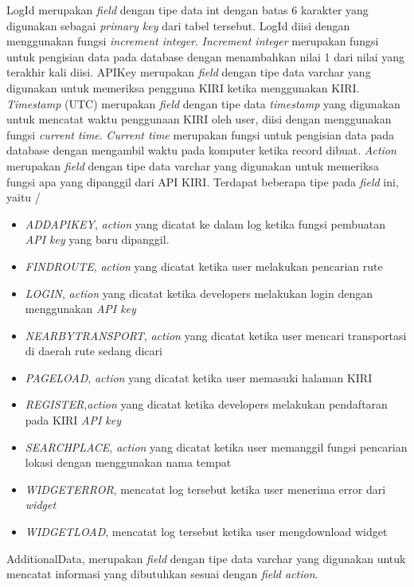 LogId merupakan \textsl{field} dengan tipe data int dengan batas 6 karakter yang digunakan sebagai \textsl{primary key} dari tabel tersebut. LogId diisi dengan menggunakan fungsi \textsl{increment integer}. \textsl{Increment integer} merupakan fungsi untuk pengisian data pada database dengan menambahkan nilai 1 dari nilai yang terakhir kali diisi.
APIKey merupakan \textsl{field} dengan tipe data varchar yang digunakan untuk memeriksa pengguna KIRI ketika menggunakan KIRI.
\textsl{Timestamp} (UTC) merupakan \textsl{field} dengan tipe data \textsl{timestamp} yang digunakan untuk mencatat waktu penggunaan KIRI oleh user, diisi dengan menggunakan fungsi \textsl{current time}. \textsl{Current time} merupakan fungsi untuk pengisian data pada database dengan mengambil waktu pada komputer ketika record dibuat.
\textsl{Action} merupakan \textsl{field} dengan tipe data varchar yang digunakan untuk memeriksa fungsi apa yang dipanggil dari API KIRI. Terdapat beberapa tipe pada \textsl{field} ini, yaitu
/\begin{itemize}
	\item \textsl{ADDAPIKEY}, \textsl{action} yang dicatat ke dalam log ketika fungsi pembuatan \textsl{API key} yang baru dipanggil.
	\item \textsl{FINDROUTE}, \textsl{action} yang dicatat ketika user melakukan pencarian rute
	\item \textsl{LOGIN}, \textsl{action} yang dicatat ketika developers melakukan login dengan menggunakan \textsl{API key}
	\item \textsl{NEARBYTRANSPORT}, \textsl{action} yang dicatat ketika user mencari transportasi di daerah rute sedang dicari
	\item \textsl{PAGELOAD}, \textsl{action} yang dicatat ketika user memasuki halaman KIRI
 	\item \textsl{REGISTER},\textsl{action} yang dicatat ketika developers melakukan pendaftaran pada KIRI \textsl{API key}
	\item \textsl{SEARCHPLACE}, \textsl{action} yang dicatat ketika user memanggil fungsi pencarian lokasi dengan menggunakan nama tempat
	\item \textsl{WIDGETERROR}, mencatat log tersebut ketika user menerima error dari \textit{widget}
	\item \textsl{WIDGETLOAD}, mencatat log tersebut ketika user mengdownload widget
\end{itemize}
AdditionalData, merupakan \textsl{field} dengan tipe data varchar yang digunakan untuk mencatat informasi yang dibutuhkan sesuai dengan \textsl{field action}.